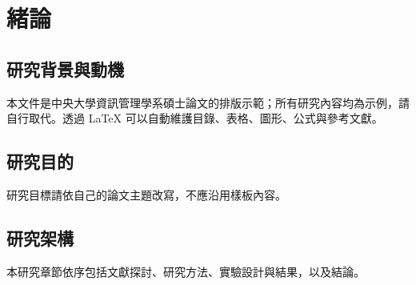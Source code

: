 \chapter{緒論}
\section{研究背景與動機}
本文件是中央大學資訊管理學系碩士論文的排版示範；所有研究內容均為示例，請自行取代。透過 LaTeX 可以自動維護目錄、表格、圖形、公式與參考文獻。

\section{研究目的}
研究目標請依自己的論文主題改寫，不應沿用樣板內容。
\section{研究架構}
本研究章節依序包括文獻探討、研究方法、實驗設計與結果，以及結論。
